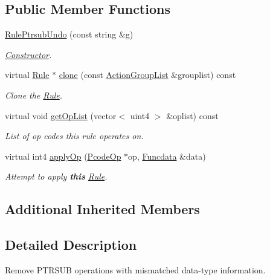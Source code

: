 \subsection*{Public Member Functions}
\begin{DoxyCompactItemize}
\item 
\mbox{\hyperlink{class_rule_ptrsub_undo_a33a385f41004f1aae1997e3d8d2b64da}{Rule\+Ptrsub\+Undo}} (const string \&g)
\begin{DoxyCompactList}\small\item\em \mbox{\hyperlink{class_constructor}{Constructor}}. \end{DoxyCompactList}\item 
virtual \mbox{\hyperlink{class_rule}{Rule}} $\ast$ \mbox{\hyperlink{class_rule_ptrsub_undo_a43d93ec61cd150a0cadb4752667558b1}{clone}} (const \mbox{\hyperlink{class_action_group_list}{Action\+Group\+List}} \&grouplist) const
\begin{DoxyCompactList}\small\item\em Clone the \mbox{\hyperlink{class_rule}{Rule}}. \end{DoxyCompactList}\item 
virtual void \mbox{\hyperlink{class_rule_ptrsub_undo_a2222b84cbf7aa02729820e3defbd818e}{get\+Op\+List}} (vector$<$ uint4 $>$ \&oplist) const
\begin{DoxyCompactList}\small\item\em List of op codes this rule operates on. \end{DoxyCompactList}\item 
virtual int4 \mbox{\hyperlink{class_rule_ptrsub_undo_abba2872c347b72aab45c05d4a674d555}{apply\+Op}} (\mbox{\hyperlink{class_pcode_op}{Pcode\+Op}} $\ast$op, \mbox{\hyperlink{class_funcdata}{Funcdata}} \&data)
\begin{DoxyCompactList}\small\item\em Attempt to apply {\bfseries{this}} \mbox{\hyperlink{class_rule}{Rule}}. \end{DoxyCompactList}\end{DoxyCompactItemize}
\subsection*{Additional Inherited Members}


\subsection{Detailed Description}
Remove P\+T\+R\+S\+UB operations with mismatched data-\/type information. 

